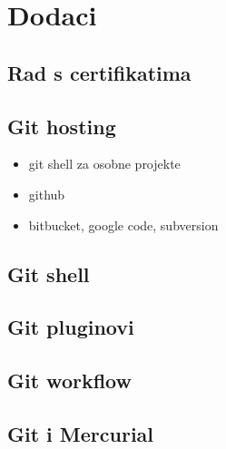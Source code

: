 \chapter*{Dodaci}

\section*{Rad s certifikatima}

\section*{Git hosting}

\begin{itemize}
   \item git shell za osobne projekte
   \item github
   \item bitbucket, google code, subversion
\end{itemize}

\section*{Git shell}

\section*{Git pluginovi}

\section*{Git workflow}

\section*{Git i Mercurial}

